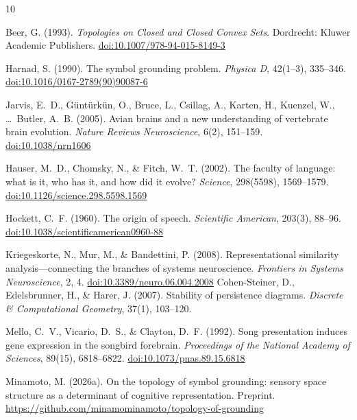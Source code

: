 \documentclass[12pt]{article}
\begin{document}

\begin{thebibliography}{10}

Beer, G. (1993).
\textit{Topologies on Closed and Closed Convex Sets}.
Dordrecht: Kluwer Academic Publishers.
\href{https://doi.org/10.1007/978-94-015-8149-3}{doi:10.1007/978-94-015-8149-3}

Harnad, S. (1990).
The symbol grounding problem.
\textit{Physica D}, 42(1--3), 335--346.
\href{https://doi.org/10.1016/0167-2789(90)90087-6}{doi:10.1016/0167-2789(90)90087-6}

Jarvis, E.~D., G{\"u}nt{\"u}rk{\"u}n, O., Bruce, L., Csillag, A.,
Karten, H., Kuenzel, W., \ldots\ Butler, A.~B. (2005).
Avian brains and a new understanding of vertebrate brain evolution.
\textit{Nature Reviews Neuroscience}, 6(2), 151--159.
\href{https://doi.org/10.1038/nrn1606}{doi:10.1038/nrn1606}

Hauser, M.~D., Chomsky, N., \& Fitch, W.~T. (2002).
The faculty of language: what is it, who has it, and how did it evolve?
\textit{Science}, 298(5598), 1569--1579.
\href{https://doi.org/10.1126/science.298.5598.1569}{doi:10.1126/science.298.5598.1569}

Hockett, C.~F. (1960).
The origin of speech.
\textit{Scientific American}, 203(3), 88--96.
\href{https://doi.org/10.1038/scientificamerican0960-88}{doi:10.1038/scientificamerican0960-88}

Kriegeskorte, N., Mur, M., \& Bandettini, P. (2008).
Representational similarity analysis---connecting the branches
of systems neuroscience.
\textit{Frontiers in Systems Neuroscience}, 2, 4.
\href{https://doi.org/10.3389/neuro.06.004.2008}{doi:10.3389/neuro.06.004.2008}
Cohen-Steiner, D., Edelsbrunner, H., \& Harer, J. (2007).
Stability of persistence diagrams.
\textit{Discrete \& Computational Geometry}, 37(1), 103--120.


Mello, C.~V., Vicario, D.~S., \& Clayton, D.~F. (1992).
Song presentation induces gene expression in the songbird forebrain.
\textit{Proceedings of the National Academy of Sciences}, 89(15), 6818--6822.
\href{https://doi.org/10.1073/pnas.89.15.6818}{doi:10.1073/pnas.89.15.6818}

Minamoto, M. (2026a).
On the topology of symbol grounding:
sensory space structure as a determinant of cognitive representation.
Preprint.
\url{https://github.com/minamominamoto/topology-of-grounding}


\end{thebibliography}
\end{document}
